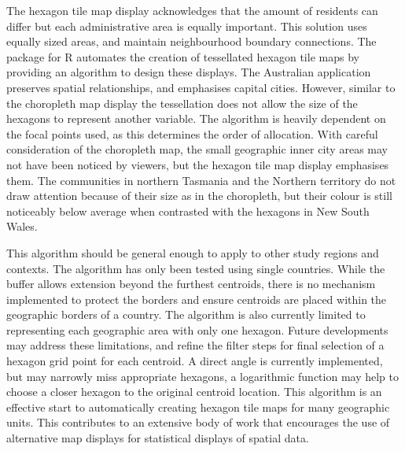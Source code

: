 The hexagon tile map display acknowledges that the amount of residents
can differ but each administrative area is equally important. This
solution uses equally sized areas, and maintain neighbourhood boundary
connections. The  package for R automates the creation of
tessellated hexagon tile maps by providing an algorithm to design these
displays. The Australian application preserves spatial relationships,
and emphasises capital cities. However, similar to the choropleth map
display the tessellation does not allow the size of the hexagons to
represent another variable. The algorithm is heavily dependent on the
focal points used, as this determines the order of allocation. With
careful consideration of the choropleth map, the small geographic inner
city areas may not have been noticed by viewers, but the hexagon tile
map display emphasises them. The communities in northern Tasmania and
the Northern territory do not draw attention because of their size as in
the choropleth, but their colour is still noticeably below average when
contrasted with the hexagons in New South Wales.

This algorithm should be general enough to apply to other study regions
and contexts. The algorithm has only been tested using single countries.
While the buffer allows extension beyond the furthest centroids, there
is no mechanism implemented to protect the borders and ensure centroids
are placed within the geographic borders of a country. The algorithm is
also currently limited to representing each geographic area with only
one hexagon. Future developments may address these limitations, and
refine the filter steps for final selection of a hexagon grid point for
each centroid. A direct angle is currently implemented, but may narrowly
miss appropriate hexagons, a logarithmic function may help to choose a
closer hexagon to the original centroid location. This algorithm is an
effective start to automatically creating hexagon tile maps for many
geographic units. This contributes to an extensive body of work that
encourages the use of alternative map displays for statistical displays
of spatial data.



\address{%
Stephanie Kobakian\\
Monash University\\%
Department of Econometrics and Business Statistics\\
%
%
%
\\\href{mailto:stephanie.kobakian@monash.edu}{\nolinkurl{stephanie.kobakian@monash.edu}}
}

